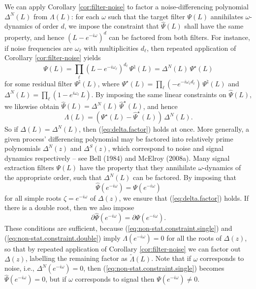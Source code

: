 \documentclass[a4paper]{book}
\begin{document}
 We can apply Corollary \ref{cor:filter-noise} to factor a 
 noise-differencing polynomial $\Delta^N (L)$ from $\Lambda (L)$:
 for each $\omega$ such that the target filter $\Psi (L)$ annihilates
 $\omega$-dynamics of order $d$, we impose the constraint
 that $\widehat{\Psi} (L)$ shall have the same property, and hence 
 ${(L- e^{-i \omega})}^d$ can be factored from both
 filters.   For instance, if noise frequencies are $\omega_{\ell}$
 with multiplicities $d_{\ell}$, then repeated application of
 Corollary \ref{cor:filter-noise} yields
\[
 \Psi (L) = \prod_{\ell} {(L -  e^{-i \omega_{\ell}})}^{d_{\ell}} \, \Psi^{\natural} (L)
   = \Delta^N (L) \, \Psi^{\star} (L)
\]
 for some residual filter $\Psi^{\natural} (L)$, where 
 $\Psi^{\star} (L) = \prod_{\ell} (-e^{-i \omega_{\ell} d_{\ell}}) \, \Psi^{\natural} (L)$
 and $\Delta^N (L) = \prod_{\ell} (1 - e^{i \omega_{\ell}} \, L)$.
 By imposing the same linear constraints on $\widehat{\Psi} (L)$, 
 we likewise obtain $\widehat{\Psi} (L) = \Delta^N (L) \, \widehat{\Psi}^{\star} (L)$,
 and hence
\begin{equation}
 \label{eq:delta-noise}
\Lambda (L) = \left(  {\Psi}^{\star} (L) - 
\widehat{\Psi}^{\star} (L) \right) \, \Delta^N (L).
\end{equation}
  So if $\Delta (L) = \Delta^N (L)$, then (\ref{eq:delta.factor}) 
  holds at once.  More generally, a given process' differencing polynomial
 may be factored into relatively prime polynomials $\Delta^N (z)$ and $\Delta^S (z)$, 
 which correspond to noise and signal dynamics
 respectively -- see Bell (1984) and McElroy (2008a). 
 Many  signal extraction filters $\Psi (L)$   have the property that they
 annihilate $\omega$-dynamics of the appropriate order, 
 such that $\Delta^N (L)$ can be factored.
 By imposing that 
\begin{equation}
\label{eq:non-stat.constraint.single}
 \widehat{\Psi} (e^{-i \omega}) = \Psi (e^{-i \omega})
 \end{equation}
 for  all simple roots $\zeta = e^{-i \omega}$ of $\Delta (z)$, we ensure that
  (\ref{eq:delta.factor}) holds. If there is a double root, then we also impose
 \begin{equation}
\label{eq:non-stat.constraint.double}
 \partial \widehat{\Psi} (e^{-i \omega}) = \partial \Psi (e^{-i \omega}).
 \end{equation}
   These conditions are sufficient, because 
  (\ref{eq:non-stat.constraint.single}) and  (\ref{eq:non-stat.constraint.double})
    imply $\Lambda (e^{-i \omega}) = 0$
  for all the roots of $\Delta (z)$, so that by repeated application of Corollary 
 \ref{cor:filter-noise} we can factor out $\Delta (z)$, labelling the
 remaining factor as $\widetilde{\Lambda } (L)$.  
   Note that if $\omega$ corresponds to noise, i.e., $\Delta^N (e^{-i \omega}) = 0$,
    then (\ref{eq:non-stat.constraint.single}) becomes 
  $ \widehat{\Psi} (e^{-i \omega}) = 0$, but if $\omega$ corresponds to signal
  then $\Psi (e^{-i \omega}) \neq 0$. 
  
\end{document}
